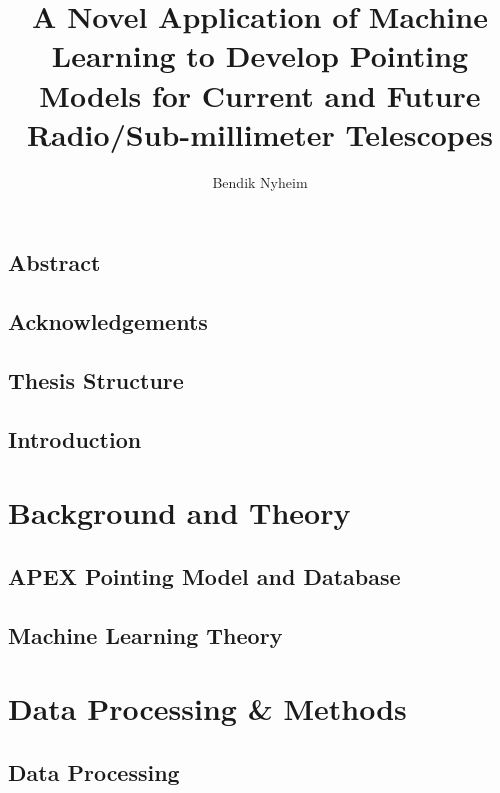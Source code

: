 \documentclass[a4paper, USenglish, 11pt]{report}
\author{Bendik Nyheim}
\title{A Novel Application of Machine Learning to Develop Pointing Models for Current and Future Radio/Sub-millimeter Telescopes}
\begin{document}

\uiomasterfp[master, program={Computational Science: Physics},
color=blue,image = {teleskopgutt2},
supervisors = {Signe Riemer Sørensen (Sintef) \and Rodrigo Parrar (ESO) \and Claudia Cicone (UiO)}]

\chapter*{Abstract}


\chapter*{Acknowledgements}

\chapter*{Thesis Structure}



\tableofcontents 

\listoffigures
\listoftables


\chapter{Introduction}\label{sec:introduction}




\part{Background and Theory}
\chapter{APEX Pointing Model and Database}



\chapter{Machine Learning Theory}


\part{Data Processing \& Methods}
\chapter{Data Processing}
\label{sec:data_processing}
\end{document}
